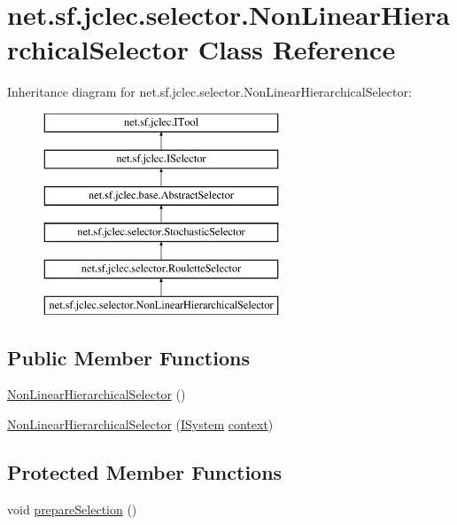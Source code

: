 \hypertarget{classnet_1_1sf_1_1jclec_1_1selector_1_1_non_linear_hierarchical_selector}{\section{net.\-sf.\-jclec.\-selector.\-Non\-Linear\-Hierarchical\-Selector Class Reference}
\label{classnet_1_1sf_1_1jclec_1_1selector_1_1_non_linear_hierarchical_selector}
}
Inheritance diagram for net.\-sf.\-jclec.\-selector.\-Non\-Linear\-Hierarchical\-Selector\-:\begin{figure}[H]
\begin{center}
\leavevmode
\includegraphics[height=6.000000cm]{classnet_1_1sf_1_1jclec_1_1selector_1_1_non_linear_hierarchical_selector}
\end{center}
\end{figure}
\subsection*{Public Member Functions}
\begin{DoxyCompactItemize}
\item 
\hyperlink{classnet_1_1sf_1_1jclec_1_1selector_1_1_non_linear_hierarchical_selector_ad51ff877bf150cf2dd7d528317266455}{Non\-Linear\-Hierarchical\-Selector} ()
\item 
\hyperlink{classnet_1_1sf_1_1jclec_1_1selector_1_1_non_linear_hierarchical_selector_a206aa05bc4576a39e4bc5adade86ff9b}{Non\-Linear\-Hierarchical\-Selector} (\hyperlink{interfacenet_1_1sf_1_1jclec_1_1_i_system}{I\-System} \hyperlink{classnet_1_1sf_1_1jclec_1_1base_1_1_abstract_selector_a4304fe5c27aa7631dc91678d22473b94}{context})
\end{DoxyCompactItemize}
\subsection*{Protected Member Functions}
\begin{DoxyCompactItemize}
\item 
void \hyperlink{classnet_1_1sf_1_1jclec_1_1selector_1_1_non_linear_hierarchical_selector_a83a69260e6b0ccf084e15e4fe0ace62d}{prepare\-Selection} ()
\end{DoxyCompactItemize}
